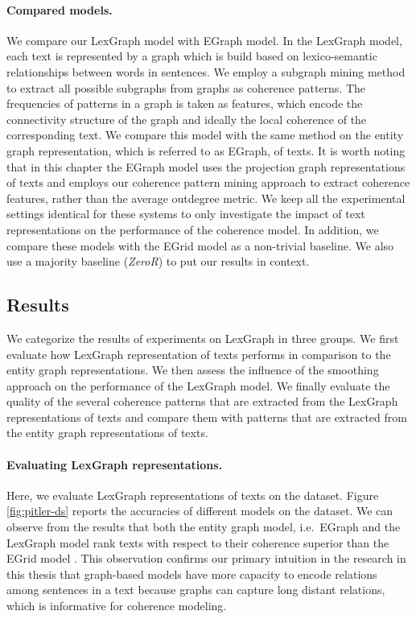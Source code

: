 \paragraph{Compared models.}
We compare our LexGraph model with EGraph model.
In the LexGraph model, each text is represented by a graph which is build based on lexico-semantic relationships between words in sentences.  
We employ a subgraph mining method to extract all possible subgraphs from graphs as coherence patterns. 
The frequencies of patterns in a graph is taken as features, which encode the connectivity structure of the graph and ideally the local coherence of the corresponding text. 
We compare this model with the same method on the entity graph representation, which is referred to as EGraph, of texts. 
It is worth noting that in this chapter the EGraph model uses the projection graph representations of texts and employs our coherence pattern mining approach to extract coherence features, rather than the average outdegree metric. 
We keep all the experimental settings identical for these systems to only investigate the impact of  text representations on the performance of the coherence model. 
In addition, we compare these models with the EGrid model \cite{barzilay08} as a non-trivial baseline. 
We also use a majority baseline (\emph{ZeroR}) to put our results in context. 


\subsection{Results}
We categorize the results of experiments on LexGraph in three groups. 
We first evaluate how LexGraph representation of texts performs in comparison to the entity graph representations.  
We then assess the influence of the smoothing approach on the performance of the LexGraph model. 
We finally evaluate the quality of the several coherence patterns that are extracted from the LexGraph representations of texts and compare them with patterns that are extracted from the entity graph representations of texts. 

\paragraph{Evaluating LexGraph representations.} 
Here, we evaluate LexGraph representations of texts on the \pitlerds dataset. 
Figure \ref{fig:pitler-ds} reports the accuracies of different models on the \pitlerds dataset. 
We can observe from the results that both the entity graph model, i.e.\ EGraph and the LexGraph model rank texts with respect to their coherence superior than the EGrid model \cite{barzilay08}.  
This observation confirms our primary intuition in the research in this thesis that graph-based models have more capacity to encode relations among sentences in a text because graphs can capture long distant relations, which is informative for coherence modeling.  

